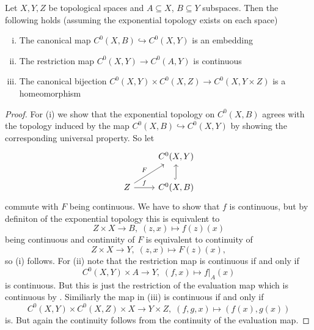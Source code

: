 \begin{lemma}
    \label{whitney_top:lem:exponential_topology_facts}
    Let $X,Y,Z$ be topological spaces and $A \subseteq X$, $B \subseteq Y$ subspaces. Then the following holds (assuming the exponential topology exists on each space)
    \begin{enumerate}[(i)]
        \item The canonical map $C^0(X,B) \hookrightarrow C^0(X,Y)$ is an embedding
        \item The restriction map $C^0(X,Y) \to C^0(A,Y)$ is continuous
        \item The canonical bijection $C^0(X,Y) \times C^0(X,Z) \to C^0(X,Y \times Z)$ is a homeomorphism
    \end{enumerate}
\end{lemma}

\begin{proof}
    For (i) we show that the exponential topology on $C^0(X,B)$ agrees with the topology induced by the map  $C^0(X,B) \hookrightarrow C^0(X,Y)$ by showing the corresponding universal property. So let
    \[\begin{tikzcd}
	& {C^0(X,Y)} \\
	Z & {C^0(X,B)}
	\arrow["{F}", from=2-1, to=1-2]
	\arrow["f", from=2-1, to=2-2]
	\arrow[hook, from=2-2, to=1-2]
\end{tikzcd}\]
commute with $F$ being continuous. We have to show that $f$ is continuous, but by definiton of the exponential topology this is equivalent to 
\[
Z \times X \to B, \; (z,x) \mapsto f(z)(x)
\]
being continuous and continuity of $F$ is equivalent to continuity of 
\[
Z \times X \to Y, \; (z,x) \mapsto F(z)(x),
\]
so (i) follows. For (ii) note that the restriction map is continuous if and only if 
\[
C^0(X,Y) \times A \to Y, \; (f,x) \mapsto f|_A(x)
\]
is continuous. But this is just the restriction of the evaluation map which is continuous by \cite{steimle_topo}. Similiarly the map in (iii) is continuous if and only if 
\[
C^0(X,Y) \times C^0(X,Z) \times X \to Y \times Z, \; (f,g,x) \mapsto (f(x),g(x))
\]
is. But again the continuity follows from the continuity of the evaluation map.
\end{proof}

